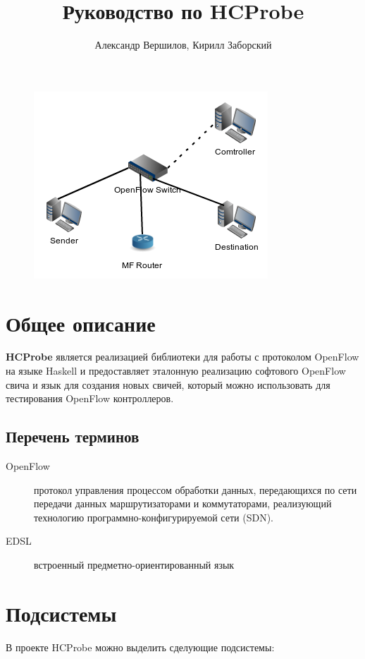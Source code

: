 \documentclass[9pt,a4paper]{article}
\title{Руководство по HCProbe}
\author{Александр Вершилов, Кирилл Заборский}
\begin{document}
\maketitle
\begin{figure}[!h]
   \centering 
   \includegraphics[width=0.3\columnwidth]{images/testcfg2.png}
\end{figure}                                                        

\tableofcontents

\pagebreak

\section{Общее описание}

\textbf{HCProbe} является реализацией библиотеки для работы с протоколом
OpenFlow на языке Haskell и предоставляет эталонную реализацию софтового
OpenFlow свича и язык для создания новых свичей, который можно использовать
для тестирования OpenFlow контроллеров.

\subsection{Перечень терминов}

\begin{description}
  \item[OpenFlow] протокол управления процессом обработки данных, передающихся
    по сети передачи данных маршрутизаторами и коммутаторами, реализующий
    технологию программно-конфигурируемой сети (SDN).
  \item[EDSL] встроенный предметно-ориентированный язык
\end{description}

\pagebreak

\section{Подсистемы}

В проекте HCProbe можно выделить сделующие подсистемы:
\end{document}

